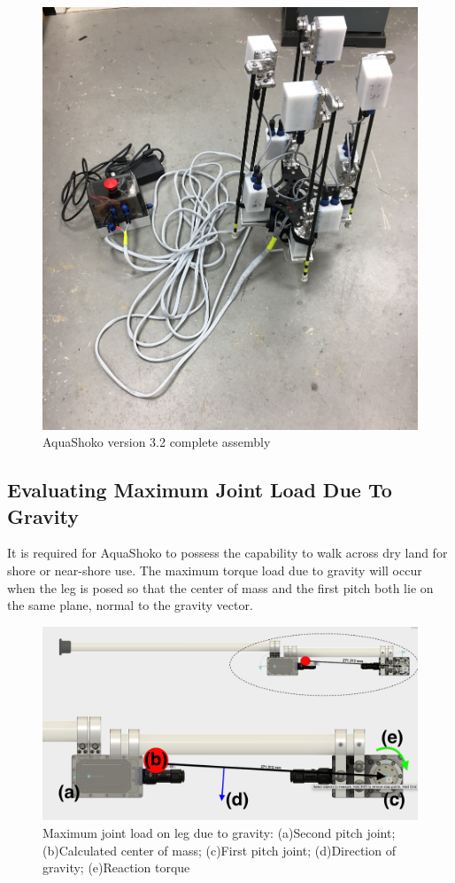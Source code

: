 \begin{figure}
\centering
\includegraphics[width=1.0\columnwidth]{./img/aquaShoko-v3dot2-photo-complete.JPG}
\caption{AquaShoko version 3.2 complete assembly }
\label{fig:shoko 3dot2}
\end{figure}

\subsection{Evaluating Maximum Joint Load Due To Gravity}
It is required for AquaShoko to possess the capability to walk across dry land for shore or near-shore use. The maximum torque load due to gravity will occur when the leg is posed so that the center of mass and the first pitch both lie on the same plane, normal to the gravity vector. 

\begin{figure}[h]
\centering
\includegraphics[width=1.0\columnwidth]{./img/aquaShoko-v3dot3-legCOM.png}
\caption{Maximum joint load on leg due to gravity: (a)Second pitch joint; (b)Calculated center of mass; (c)First pitch joint; (d)Direction of gravity; (e)Reaction torque}
\label{fig:shoko 3dot2-2}
\end{figure}


